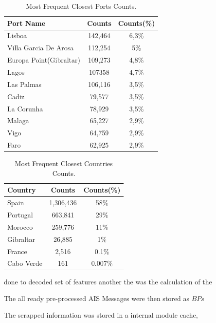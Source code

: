 \begin{table}[H]
\centering
\caption{Most Frequent Closest Ports Counts.}
\label{Table: 5 Closest Ports}
\begin{tabular}{@{}lcc@{}}
\toprule
Port Name & Counts & Counts(\%) \\ \midrule
Lisboa & 142,464 & 6,3\% \\
Villa Garcia De Arosa & 112,254 & 5\% \\
Europa Point(Gibraltar) & 109,273 & 4,8\% \\
Lagos & 107358 & 4,7\% \\
Las Palmas & 106,116 & 3,5\% \\
Cadiz & 79,577 & 3,5\% \\
La Corunha & 78,929 & 3,5\% \\
Malaga & 65,227 & 2,9\% \\
Vigo & 64,759 & 2,9\% \\
Faro & 62,925 & 2,9\% \\ \bottomrule
\end{tabular}
\end{table}

\begin{table}[H]
\centering
\caption{Most Frequent Closest Countries Counts.}
\label{Table: 5 Closest Countries}
\begin{tabular}{@{}lcc@{}}
\toprule
Country & Counts & Counts(\%) \\ \midrule
Spain & 1,306,436 & 58\% \\
Portugal & 663,841 & 29\% \\
Morocco & 259,776 & 11\% \\
Gibraltar & 26,885 & 1\% \\
France & 2,516 & 0.1\% \\
Cabo Verde & 161 & 0.007\% \\ \bottomrule
\end{tabular}
\end{table}
done to decoded set of features another the was the calculation of the  

The all ready pre-processed AIS Messages were then stored as $BPs$

The scrapped information was stored in a internal module cache, 


